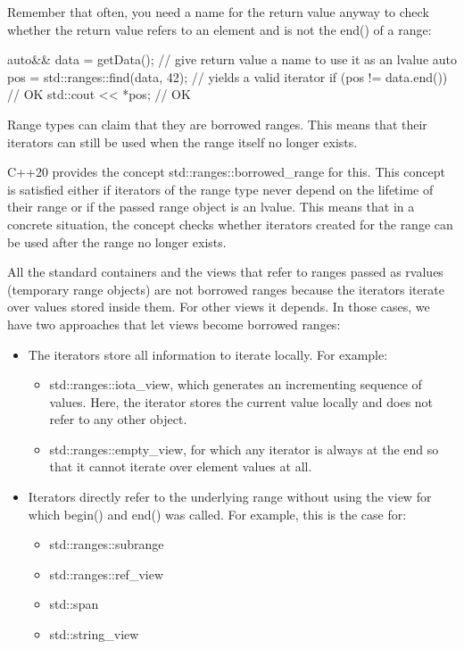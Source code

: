 Remember that often, you need a name for the return value anyway to check whether the return value refers to an element and is not the end() of a range:

\begin{cpp}
auto&& data = getData(); // give return value a name to use it as an lvalue
auto pos = std::ranges::find(data, 42); // yields a valid iterator
if (pos != data.end()) { // OK
	std::cout << *pos; // OK
}
\end{cpp}


Range types can claim that they are borrowed ranges. This means that their iterators can still be used when the range itself no longer exists.

C++20 provides the concept std::ranges::borrowed\_range for this. This concept is satisfied either if iterators of the range type never depend on the lifetime of their range or if the passed range object is an lvalue. This means that in a concrete situation, the concept checks whether iterators created for the range can be used after the range no longer exists.

All the standard containers and the views that refer to ranges passed as rvalues (temporary range objects) are not borrowed ranges because the iterators iterate over values stored inside them. For other views it depends. In those cases, we have two approaches that let views become borrowed ranges:

\begin{itemize}
\item
The iterators store all information to iterate locally. For example:

\begin{itemize}
\item
std::ranges::iota\_view, which generates an incrementing sequence of values. Here, the iterator stores the current value locally and does not refer to any other object.

\item
std::ranges::empty\_view, for which any iterator is always at the end so that it cannot iterate over element values at all.
\end{itemize}

\item
Iterators directly refer to the underlying range without using the view for which begin() and end() was called. For example, this is the case for:

\begin{itemize}
\item
std::ranges::subrange

\item
std::ranges::ref\_view

\item
std::span

\item
std::string\_view
\end{itemize}
\end{itemize}

